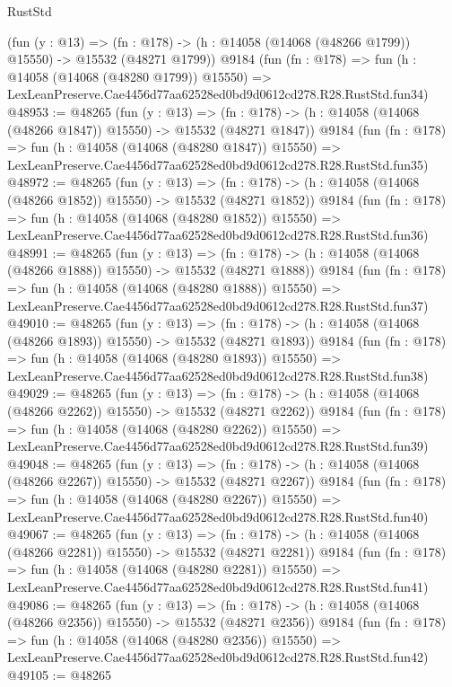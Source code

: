 \begin{lexlean}{RustStd}
\begin{coremodule}
    (fun (y : @13) =>
    (fn : @178) -> (h : @14058 (@14068 (@48266 @1799)) @15550) -> @15532 (@48271 @1799))
    @9184
    (fun (fn : @178) =>
    fun (h : @14058 (@14068 (@48280 @1799)) @15550) =>
    LexLeanPreserve.Cae4456d77aa62528ed0bd9d0612cd278.R28.RustStd.fun34)
@48953 := @48265
    (fun (y : @13) =>
    (fn : @178) -> (h : @14058 (@14068 (@48266 @1847)) @15550) -> @15532 (@48271 @1847))
    @9184
    (fun (fn : @178) =>
    fun (h : @14058 (@14068 (@48280 @1847)) @15550) =>
    LexLeanPreserve.Cae4456d77aa62528ed0bd9d0612cd278.R28.RustStd.fun35)
@48972 := @48265
    (fun (y : @13) =>
    (fn : @178) -> (h : @14058 (@14068 (@48266 @1852)) @15550) -> @15532 (@48271 @1852))
    @9184
    (fun (fn : @178) =>
    fun (h : @14058 (@14068 (@48280 @1852)) @15550) =>
    LexLeanPreserve.Cae4456d77aa62528ed0bd9d0612cd278.R28.RustStd.fun36)
@48991 := @48265
    (fun (y : @13) =>
    (fn : @178) -> (h : @14058 (@14068 (@48266 @1888)) @15550) -> @15532 (@48271 @1888))
    @9184
    (fun (fn : @178) =>
    fun (h : @14058 (@14068 (@48280 @1888)) @15550) =>
    LexLeanPreserve.Cae4456d77aa62528ed0bd9d0612cd278.R28.RustStd.fun37)
@49010 := @48265
    (fun (y : @13) =>
    (fn : @178) -> (h : @14058 (@14068 (@48266 @1893)) @15550) -> @15532 (@48271 @1893))
    @9184
    (fun (fn : @178) =>
    fun (h : @14058 (@14068 (@48280 @1893)) @15550) =>
    LexLeanPreserve.Cae4456d77aa62528ed0bd9d0612cd278.R28.RustStd.fun38)
@49029 := @48265
    (fun (y : @13) =>
    (fn : @178) -> (h : @14058 (@14068 (@48266 @2262)) @15550) -> @15532 (@48271 @2262))
    @9184
    (fun (fn : @178) =>
    fun (h : @14058 (@14068 (@48280 @2262)) @15550) =>
    LexLeanPreserve.Cae4456d77aa62528ed0bd9d0612cd278.R28.RustStd.fun39)
@49048 := @48265
    (fun (y : @13) =>
    (fn : @178) -> (h : @14058 (@14068 (@48266 @2267)) @15550) -> @15532 (@48271 @2267))
    @9184
    (fun (fn : @178) =>
    fun (h : @14058 (@14068 (@48280 @2267)) @15550) =>
    LexLeanPreserve.Cae4456d77aa62528ed0bd9d0612cd278.R28.RustStd.fun40)
@49067 := @48265
    (fun (y : @13) =>
    (fn : @178) -> (h : @14058 (@14068 (@48266 @2281)) @15550) -> @15532 (@48271 @2281))
    @9184
    (fun (fn : @178) =>
    fun (h : @14058 (@14068 (@48280 @2281)) @15550) =>
    LexLeanPreserve.Cae4456d77aa62528ed0bd9d0612cd278.R28.RustStd.fun41)
@49086 := @48265
    (fun (y : @13) =>
    (fn : @178) -> (h : @14058 (@14068 (@48266 @2356)) @15550) -> @15532 (@48271 @2356))
    @9184
    (fun (fn : @178) =>
    fun (h : @14058 (@14068 (@48280 @2356)) @15550) =>
    LexLeanPreserve.Cae4456d77aa62528ed0bd9d0612cd278.R28.RustStd.fun42)
@49105 := @48265

\end{coremodule}
\end{lexlean}
